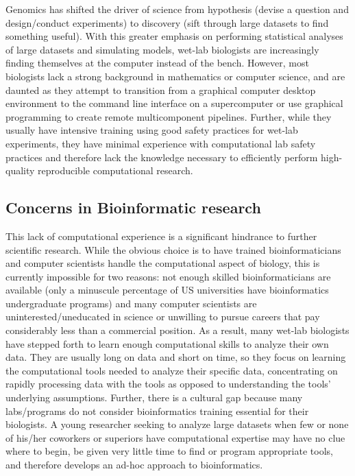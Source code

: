 \documentclass[ChapterTOCs,krantz2]{krantz} %
\begin{document}
Genomics has shifted the driver of science from hypothesis (devise a question 
and design/conduct experiments) to discovery (sift through large datasets 
to find something useful).  With this greater emphasis on performing 
statistical analyses of large datasets and simulating models, wet-lab biologists are
increasingly finding themselves at the computer instead of the bench\cite{Merali2010}.  
However, most biologists lack a strong background in mathematics or
computer science\cite{Bialek2004,Pevzner2009}, 
and are daunted as they attempt to transition from a graphical
computer desktop environment to the command line interface on a 
supercomputer or use graphical programming to create remote 
multicomponent pipelines.  Further, while they
usually have intensive training using good safety practices 
for wet-lab experiments, they have minimal experience with computational 
lab safety practices and therefore lack the knowledge necessary to 
efficiently perform high-quality reproducible 
computational research\cite{Merali2010,Segal2007}.

\subsection{Concerns in Bioinformatic research}

This lack of computational experience is a significant hindrance to further
scientific research.  While the obvious choice is
to have trained bioinformaticians and computer scientists handle the
computational aspect of biology, this is currently impossible for two reasons:
not enough skilled bioinformaticians are available (only a minuscule percentage
of US universities have bioinformatics undergraduate programs) and many
computer scientists are uninterested/uneducated in science or unwilling to pursue careers
that pay considerably less than a commercial position.  
As a result, many
wet-lab biologists have stepped forth to learn enough 
computational skills to analyze their own data\cite{Heaton2012,Kelly2008}.  
They are usually long on data and short on time, so they
focus on learning the computational tools needed to analyze their specific
data, concentrating on rapidly processing data with the tools 
as opposed to understanding the tools' underlying
assumptions.  Further, there is a cultural gap
because many labs/programs do not consider bioinformatics training 
essential for their biologists\cite{Segal2007}.  A young researcher seeking to analyze large datasets 
when few or none of his/her coworkers or superiors have
computational expertise may have no clue where to begin, be given very little
time to find or program appropriate tools, and therefore develops an ad-hoc
approach to bioinformatics.    
\end{document}
